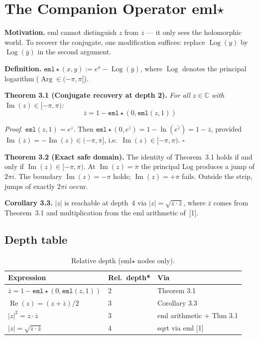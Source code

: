 \documentclass[11pt,a4paper]{article}
\begin{document}
\section{The Companion Operator eml$\star$}

\textbf{Motivation.} eml cannot distinguish $z$ from $\overline{z}$ --- it only sees the holomorphic world. To recover the conjugate, one modification suffices: replace $\operatorname{Log}(y)$ by $\operatorname{Log}(\overline{y})$ in the second argument.

\textbf{Definition.} $\texttt{eml}\star(x, y) := e^x - \operatorname{Log}(\overline{y})$, where $\operatorname{Log}$ denotes the principal logarithm ($\operatorname{Arg} \in (-\pi, \pi]$).

\textbf{Theorem 3.1 (Conjugate recovery at depth 2).} \textit{For all $z \in \mathbb{C}$ with $\operatorname{Im}(z) \in [-\pi, \pi)$:}
\[
\overline{z} = 1 - \texttt{eml}\star(0, \texttt{eml}(z, 1))
\]

\textit{Proof.} $\texttt{eml}(z, 1) = e^z$. Then $\texttt{eml}\star(0, e^z) = 1 - \ln(\overline{e^z}) = 1 - \overline{z}$, provided $\operatorname{Im}(\overline{z}) = -\operatorname{Im}(z) \in (-\pi, \pi]$, i.e.\ $\operatorname{Im}(z) \in [-\pi, \pi)$. $\square$

\textbf{Theorem 3.2 (Exact safe domain).} The identity of Theorem~3.1 holds if and only if $\operatorname{Im}(z) \in [-\pi, \pi)$. At $\operatorname{Im}(z) = \pi$ the principal Log produces a jump of $2\pi i$. The boundary $\operatorname{Im}(z) = -\pi$ holds; $\operatorname{Im}(z) = +\pi$ fails. Outside the strip, jumps of exactly $2\pi i$ occur.

\textbf{Corollary 3.3.} $|z|$ is reachable at depth~4 via $|z| = \sqrt{z \cdot \overline{z}}$, where $\overline{z}$ comes from Theorem~3.1 and multiplication from the eml arithmetic of~[1].

\subsection{Depth table}

\begin{table}[h]
\centering
\begin{tabular}{lll}
\toprule
Expression & Rel.\ depth* & Via \\
\midrule
$\overline{z} = 1 - \texttt{eml}\star(0, \texttt{eml}(z,1))$ & 2 & Theorem 3.1 \\
$\operatorname{Re}(z) = (z + \overline{z})/2$ & 3 & Corollary 3.3 \\
$|z|^2 = z \cdot \overline{z}$ & 3 & eml arithmetic + Thm 3.1 \\
$|z| = \sqrt{z \cdot \overline{z}}$ & 4 & sqrt via eml [1] \\
\bottomrule
\end{tabular}
\caption{Relative depth (eml$\star$ nodes only).}
\end{table}
\end{document}
